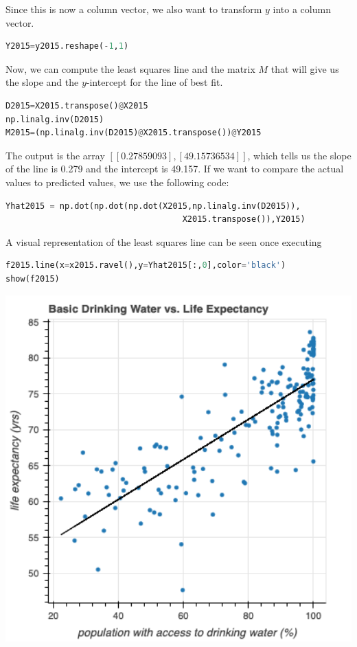 \documentclass[12pt]{article}
\begin{document}
\noindent
Since this is now a column vector, we also want to transform $y$ into a column vector.
\begin{lstlisting}[language=Python]
Y2015=y2015.reshape(-1,1)
\end{lstlisting}

\noindent
Now, we can compute the least squares line and the matrix $M$ that will give us the slope and the $y$-intercept for the line of best fit.
\begin{lstlisting}[language=Python]
D2015=X2015.transpose()@X2015
np.linalg.inv(D2015)
M2015=(np.linalg.inv(D2015)@X2015.transpose())@Y2015
\end{lstlisting}

\noindent
The output is the array $[[0.27859093],[49.15736534]]$, which tells us the slope of the line is 0.279 and the intercept is 49.157. If we want to compare the actual values to predicted values, we use the following code:
\begin{lstlisting}[language=Python]
Yhat2015 = np.dot(np.dot(np.dot(X2015,np.linalg.inv(D2015)),
                                    X2015.transpose()),Y2015)
\end{lstlisting}

\noindent
A visual representation of the least squares line can be seen once executing
\begin{lstlisting}[language=Python]
f2015.line(x=x2015.ravel(),y=Yhat2015[:,0],color='black')
show(f2015)
\end{lstlisting}

\begin{center}
\includegraphics[width=6in]{Figures/figure2.png}\\
\end{center}
\end{document}
